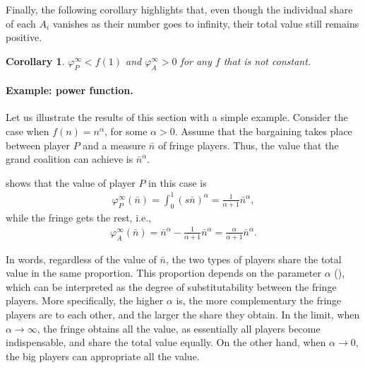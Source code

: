 \documentclass[a4paper]{article}
\newtheorem{corollary}{Corollary}
\begin{document}
Finally, the following corollary highlights that, even though the individual share of each $A_i$ vanishes as their number goes to infinity, their total value still remains positive.
\begin{corollary}
    \label{cor:fringe_value_2}
    $\varphi_P^\infty < f(1)$ and $\varphi_A^\infty > 0$ for any $f$ that is not constant.
\end{corollary}


\paragraph{Example: power function.}
\label{sec:power_function_example}

Let us illustrate the results of this section with a simple example.
Consider the case when $f(n) = n^\alpha$, for some $\alpha > 0$.
Assume that the bargaining takes place between player $P$ and a measure $\bar{n}$ of fringe players.
Thus, the value that the grand coalition can achieve is $\bar{n}^\alpha$.

 shows that the value of player $P$ in this case is
\begin{align*}
    \varphi_P^\infty(\bar{n}) = \int_0^1 (s \bar{n})^\alpha = \frac{1}{\alpha + 1} \bar{n}^\alpha,
\end{align*}
while the fringe gets the rest, i.e.,
\begin{align*}
    \varphi_A^\infty(\bar{n}) = \bar{n}^\alpha - \frac{1}{\alpha + 1} \bar{n}^\alpha = \frac{\alpha}{\alpha + 1} \bar{n}^\alpha.
\end{align*}

In words, regardless of the value of $\bar{n}$, the two types of players share the total value in the same proportion.
This proportion depends on the parameter $\alpha$ (), which can be interpreted as the degree of substitutability between the fringe players.
More specifically, the higher $\alpha$ is, the more complementary the fringe players are to each other, and the larger the share they obtain.
In the limit, when $\alpha \to \infty$, the fringe obtains all the value, as essentially all players become indispensable, and share the total value equally.
On the other hand, when $\alpha \to 0$, the big players can appropriate all the value.
\end{document}
